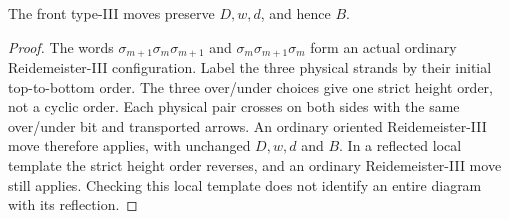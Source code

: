 \begin{lemma}\label{ng:front-III}
The front type-III moves preserve $D,w,d$, and hence $B$.
\end{lemma}
\begin{proof}
The words $\sigma_{m+1}\sigma_m\sigma_{m+1}$ and
$\sigma_m\sigma_{m+1}\sigma_m$ form an actual ordinary
Reidemeister-III configuration. Label the three physical strands by
their initial top-to-bottom order. The three over/under choices give
one strict height order, not a cyclic order. Each physical pair crosses
on both sides with the same over/under bit and transported arrows.
An ordinary oriented Reidemeister-III move therefore applies, with
unchanged $D,w,d$ and $B$. In a reflected local template the strict
height order reverses, and an ordinary Reidemeister-III move still
applies. Checking this local template does not identify an entire
diagram with its reflection.
\end{proof}

